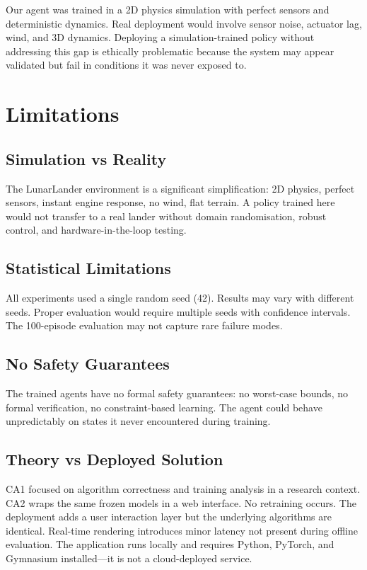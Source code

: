 \documentclass[11pt,a4paper]{article}
\begin{document}
Our agent was trained in a 2D physics simulation with perfect sensors and deterministic dynamics. Real deployment would involve sensor noise, actuator lag, wind, and 3D dynamics. Deploying a simulation-trained policy without addressing this gap is ethically problematic because the system may appear validated but fail in conditions it was never exposed to.

\section{Limitations}

\subsection{Simulation vs Reality}

The LunarLander environment is a significant simplification: 2D physics, perfect sensors, instant engine response, no wind, flat terrain. A policy trained here would not transfer to a real lander without domain randomisation, robust control, and hardware-in-the-loop testing.

\subsection{Statistical Limitations}

All experiments used a single random seed (42). Results may vary with different seeds. Proper evaluation would require multiple seeds with confidence intervals. The 100-episode evaluation may not capture rare failure modes.

\subsection{No Safety Guarantees}

The trained agents have no formal safety guarantees: no worst-case bounds, no formal verification, no constraint-based learning. The agent could behave unpredictably on states it never encountered during training.

\subsection{Theory vs Deployed Solution}

CA1 focused on algorithm correctness and training analysis in a research context. CA2 wraps the same frozen models in a web interface. No retraining occurs. The deployment adds a user interaction layer but the underlying algorithms are identical. Real-time rendering introduces minor latency not present during offline evaluation. The application runs locally and requires Python, PyTorch, and Gymnasium installed---it is not a cloud-deployed service.
\end{document}
